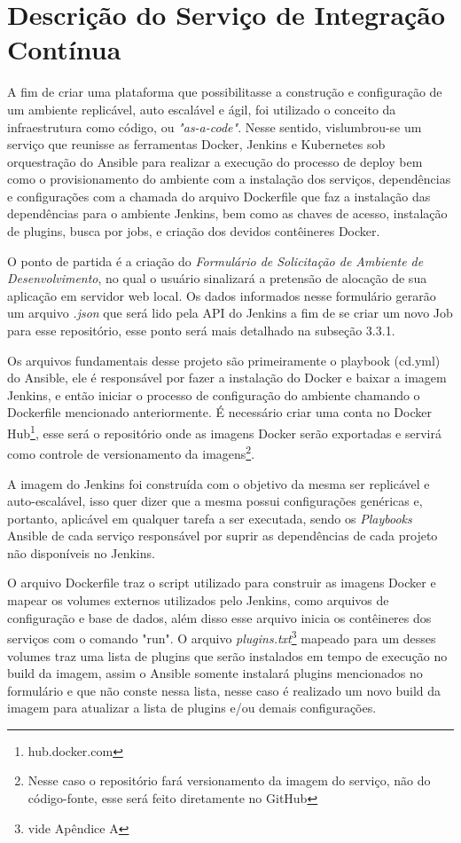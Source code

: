 \section{Descrição do Serviço de Integração Contínua}

A fim de criar uma plataforma que possibilitasse a construção e configuração de um ambiente replicável, auto escalável e ágil, foi utilizado o conceito da infraestrutura como código, ou \textit{"as-a-code"}. Nesse sentido, vislumbrou-se um serviço que reunisse as ferramentas Docker, Jenkins e Kubernetes sob orquestração do Ansible para realizar a execução do processo de deploy bem como o provisionamento do ambiente com a instalação dos serviços, dependências e configurações com a chamada do arquivo Dockerfile que faz a instalação das dependências para o ambiente Jenkins, bem como as chaves de acesso, instalação de plugins, busca por jobs, e criação dos devidos contêineres Docker. 

O ponto de partida é a criação do \textit{Formulário de Solicitação de Ambiente de Desenvolvimento}, no qual o usuário sinalizará a pretensão de alocação de sua aplicação em servidor web local. Os dados informados nesse formulário gerarão um arquivo \textit{.json} que será lido pela API do Jenkins a fim de se criar um novo Job para esse repositório, esse ponto será mais detalhado na subseção 3.3.1.

Os arquivos fundamentais desse projeto são primeiramente o playbook (cd.yml) do Ansible, ele é responsável por fazer a instalação do Docker e baixar a imagem Jenkins, e então iniciar o processo de configuração do ambiente chamando o Dockerfile mencionado anteriormente. É necessário criar uma conta no Docker Hub\footnote{hub.docker.com}, esse será o repositório onde as imagens Docker serão exportadas e servirá como controle de versionamento da imagens\footnote{Nesse caso o repositório fará versionamento da imagem do serviço, não do código-fonte, esse será feito diretamente no GitHub}.

A imagem do Jenkins foi construída com o objetivo da mesma ser replicável e auto-escalável, isso quer dizer que a mesma possui configurações genéricas e, portanto, aplicável em qualquer tarefa a ser executada, sendo os \textit{Playbooks }Ansible de cada serviço responsável por suprir as dependências de cada projeto não disponíveis no Jenkins.

O arquivo Dockerfile traz o script utilizado para construir as imagens Docker e mapear os volumes externos utilizados pelo Jenkins, como arquivos de configuração e base de dados, além disso esse arquivo inicia os contêineres dos serviços com o comando "run". O arquivo \textit{plugins.txt}\footnote{vide Apêndice A} mapeado para um desses volumes traz uma lista de plugins que serão instalados em tempo de execução no build da imagem, assim o Ansible somente instalará plugins mencionados no formulário e que não conste nessa lista, nesse caso é realizado um novo build da imagem para atualizar a lista de plugins e/ou demais configurações.

